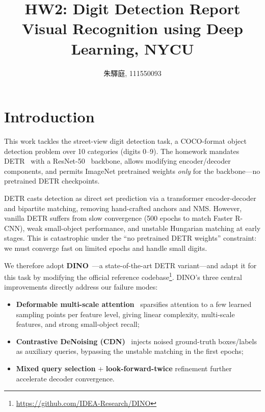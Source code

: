 \documentclass[10pt,twocolumn,letterpaper]{article}
\begin{document}
\title{\LARGE HW2: Digit Detection Report \\[0.5em] \large Visual Recognition using Deep Learning, NYCU}
\author{朱驛庭, 111550093}
\maketitle

\section{Introduction}
\label{sec:intro}

This work tackles the street-view digit detection task, a COCO-format object detection problem over 10 categories (digits 0--9). The homework mandates DETR~\cite{carion2020detr} with a ResNet-50~\cite{he2016resnet} backbone, allows modifying encoder/decoder components, and permits ImageNet pretrained weights \emph{only} for the backbone---no pretrained DETR checkpoints.

DETR casts detection as direct set prediction via a transformer encoder-decoder and bipartite matching, removing hand-crafted anchors and NMS. However, vanilla DETR suffers from slow convergence (500 epochs to match Faster R-CNN), weak small-object performance, and unstable Hungarian matching at early stages. This is catastrophic under the ``no pretrained DETR weights'' constraint: we must converge fast on limited epochs and handle small digits.

We therefore adopt \textbf{DINO}~\cite{zhang2023dino}---a state-of-the-art DETR variant---and adapt it for this task by modifying the official reference codebase\footnote{\url{https://github.com/IDEA-Research/DINO}}. DINO's three central improvements directly address our failure modes:
\begin{itemize}
  \item \textbf{Deformable multi-scale attention}~\cite{zhu2021deformable} sparsifies attention to a few learned sampling points per feature level, giving linear complexity, multi-scale features, and strong small-object recall;
  \item \textbf{Contrastive DeNoising (CDN)}~\cite{li2022dndetr,zhang2023dino} injects noised ground-truth boxes/labels as auxiliary queries, bypassing the unstable matching in the first epochs;
  \item \textbf{Mixed query selection} + \textbf{look-forward-twice} refinement further accelerate decoder convergence.
\end{itemize}
\end{document}
